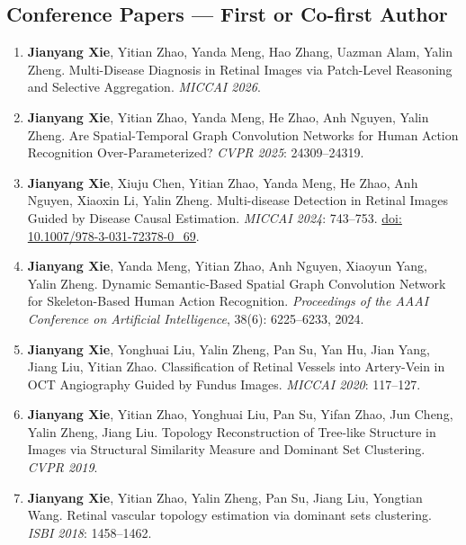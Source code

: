 \documentclass[11pt,a4paper]{article}
\begin{document}
\subsection*{Conference Papers --- First or Co-first Author}
\begin{enumerate}[label={\textcolor{accent}{\sffamily\footnotesize C\arabic*}},leftmargin=2.5em,itemsep=8pt,parsep=0pt]
\item \textbf{Jianyang Xie}, Yitian Zhao, Yanda Meng, Hao Zhang, Uazman Alam, Yalin Zheng. Multi-Disease Diagnosis in Retinal Images via Patch-Level Reasoning and Selective Aggregation. \textit{MICCAI 2026}.
\item \textbf{Jianyang Xie}, Yitian Zhao, Yanda Meng, He Zhao, Anh Nguyen, Yalin Zheng. Are Spatial-Temporal Graph Convolution Networks for Human Action Recognition Over-Parameterized? \textit{CVPR 2025}: 24309--24319.
\item \textbf{Jianyang Xie}, Xiuju Chen, Yitian Zhao, Yanda Meng, He Zhao, Anh Nguyen, Xiaoxin Li, Yalin Zheng. Multi-disease Detection in Retinal Images Guided by Disease Causal Estimation. \textit{MICCAI 2024}: 743--753. \href{https://doi.org/10.1007/978-3-031-72378-0_69}{doi: 10.1007/978-3-031-72378-0\_69}.
\item \textbf{Jianyang Xie}, Yanda Meng, Yitian Zhao, Anh Nguyen, Xiaoyun Yang, Yalin Zheng. Dynamic Semantic-Based Spatial Graph Convolution Network for Skeleton-Based Human Action Recognition. \textit{Proceedings of the AAAI Conference on Artificial Intelligence}, 38(6): 6225--6233, 2024.
\item \textbf{Jianyang Xie}, Yonghuai Liu, Yalin Zheng, Pan Su, Yan Hu, Jian Yang, Jiang Liu, Yitian Zhao. Classification of Retinal Vessels into Artery-Vein in OCT Angiography Guided by Fundus Images. \textit{MICCAI 2020}: 117--127.
\item \textbf{Jianyang Xie}, Yitian Zhao, Yonghuai Liu, Pan Su, Yifan Zhao, Jun Cheng, Yalin Zheng, Jiang Liu. Topology Reconstruction of Tree-like Structure in Images via Structural Similarity Measure and Dominant Set Clustering. \textit{CVPR 2019}.
\item \textbf{Jianyang Xie}, Yitian Zhao, Yalin Zheng, Pan Su, Jiang Liu, Yongtian Wang. Retinal vascular topology estimation via dominant sets clustering. \textit{ISBI 2018}: 1458--1462.
\end{enumerate}
\end{document}

